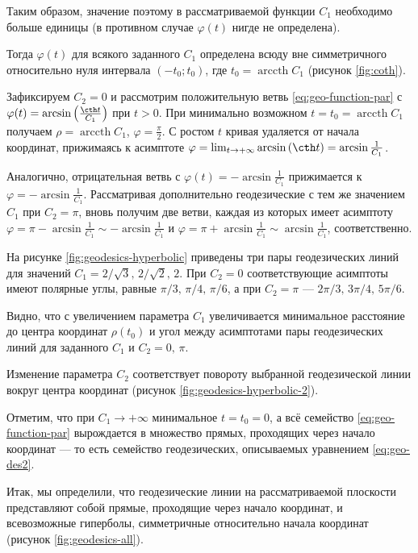 \documentclass{article}
\numberwithin{equation}{section}
\renewcommand{\phi}{\varphi}
\DeclareMathOperator{\arccth}{arccth}
\begin{document}
Таким образом, значение поэтому в рассматриваемой функции $C_1$
необходимо больше единицы (в противном случае $\phi(t)$ нигде не
определена).

Тогда $\phi(t)$ для всякого заданного $C_1$ определена всюду вне
симметричного относительно нуля интервала $(-t_0;t_0)$, где $t_0 =
\arccth{C_1}$ (рисунок \ref{fig:coth}).

Зафиксируем $C_2 = 0$ и рассмотрим положительную ветвь
\eqref{eq:geo-function-par} с $\phi(t) = \arcsin\left(\frac{\cth
    t}{C_1}\right)$ при $t>0$. При минимально возможном $t = t_0 =
\arccth{C_1}$ получаем $\rho = \arccth{C_1}$, $\phi = \frac{\pi}{2}$. С ростом
$t$ кривая удаляется от начала координат, прижимаясь к асимптоте
$\phi = \lim_{t \to +\infty} \arcsin{\left(\cth t\right)} = \arcsin{\frac{1}{C_1}}$.

Аналогично, отрицательная ветвь с $\phi(t) = -\arcsin\frac{1}{C_1}$
прижимается к $\phi = -\arcsin{\frac{1}{C_1}}$. Рассматривая
дополнительно геодезические с тем же значением $C_1$ при $C_2 = \pi$,
вновь получим две ветви, каждая из которых имеет асимптоту $\phi =
\pi-\arcsin\frac{1}{C_1} \sim -\arcsin\frac{1}{C_1}$ и $\phi =
\pi+\arcsin\frac{1}{C_1} \sim \arcsin\frac{1}{C_1}$, соответственно.



На рисунке \ref{fig:geodesics-hyperbolic} приведены три пары
геодезических линий для значений $C_1=2/\sqrt{3},\,2/\sqrt{2},\,2$.
При $C_2=0$ соответствующие асимптоты имеют полярные углы, равные
$\pi/3,\,\pi/4,\,\pi/6$, а при $C_2=\pi$ — $2\pi/3,\,3\pi/4,\,5\pi/6$.

Видно, что с увеличением параметра $C_1$ увеличивается минимальное
расстояние до центра координат $\rho(t_0)$ и угол между асимптотами
пары геодезических линий для заданного $C_1$ и $C_2=0,\,\pi$.

Изменение параметра $C_2$ соответствует повороту выбранной
геодезической линии вокруг центра координат (рисунок
\ref{fig:geodesics-hyperbolic-2}).



Отметим, что при $C_1 \to +\infty$ минимальное $t= t_0 = 0$, а всё
семейство \eqref{eq:geo-function-par} вырождается в множество прямых,
проходящих через начало координат — то есть семейство геодезических,
описываемых уравнением \eqref{eq:geo-des2}.

Итак, мы определили, что геодезические линии на рассматриваемой
плоскости представляют собой прямые, проходящие через начало
координат, и всевозможные гиперболы, симметричные относительно начала
координат (рисунок \ref{fig:geodesics-all}).
\end{document}
